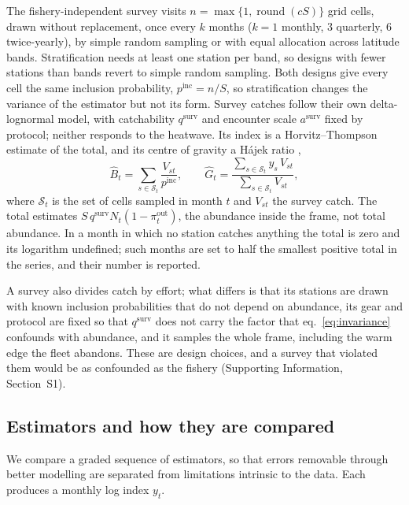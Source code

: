 \documentclass[11pt,a4paper]{article}
\newcommand{\vt}[1]{\text{#1}}
\begin{document}
The fishery-independent survey visits $n=\max\{1,\operatorname{round}(cS)\}$ grid cells, drawn without replacement, once every $k$ months ($k=1$ monthly, 3 quarterly, 6 twice-yearly), by simple random sampling or with equal allocation across latitude bands. Stratification needs at least one station per band, so designs with fewer stations than bands revert to simple random sampling. Both designs give every cell the same inclusion probability, $p^{\vt{inc}} = n/S$, so stratification changes the variance of the estimator but not its form. Survey catches follow their own delta-lognormal model, with catchability $q^{\vt{surv}}$ and encounter scale $a^{\vt{surv}}$ fixed by protocol; neither responds to the heatwave. Its index is a Horvitz--Thompson estimate of the total, and its centre of gravity a Hájek ratio \citep{horvitz1952,sarndal1992},
\begin{equation}
\widehat B_t = \sum_{s\in\mathcal S_t}\frac{V_{st}}{p^{\vt{inc}}}, \qquad \widehat G_t = \frac{\sum_{s\in\mathcal S_t} y_s\,V_{st}}{\sum_{s\in\mathcal S_t}V_{st}},
\label{eq:survey}
\end{equation}
where $\mathcal S_t$ is the set of cells sampled in month $t$ and $V_{st}$ the survey catch. The total estimates $S\,q^{\vt{surv}}N_t(1-\pi^{\vt{out}}_t)$, the abundance inside the frame, not total abundance. In a month in which no station catches anything the total is zero and its logarithm undefined; such months are set to half the smallest positive total in the series, and their number is reported.

A survey also divides catch by effort; what differs is that its stations are drawn with known inclusion probabilities that do not depend on abundance, its gear and protocol are fixed so that $q^{\vt{surv}}$ does not carry the factor that eq.~\eqref{eq:invariance} confounds with abundance, and it samples the whole frame, including the warm edge the fleet abandons. These are design choices, and a survey that violated them would be as confounded as the fishery (Supporting Information, Section~S1).

\subsection{Estimators and how they are compared}
\label{sec:estimators}

We compare a graded sequence of estimators, so that errors removable through better modelling are separated from limitations intrinsic to the data. Each produces a monthly log index $y_t$.
\end{document}
